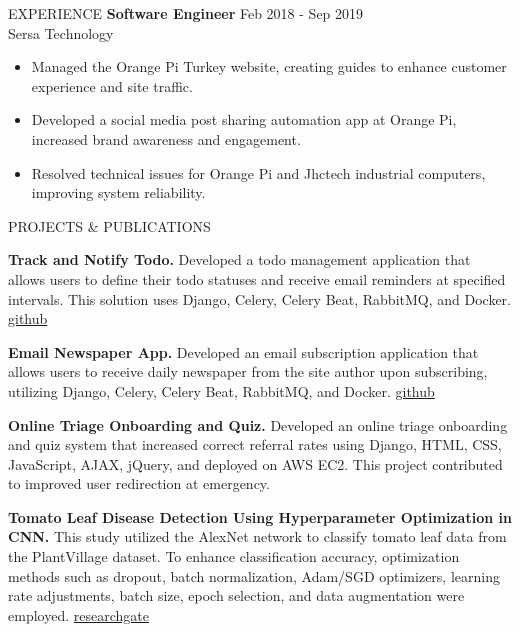 \documentclass{resume} %
\begin{document}
\begin{rSection}{EXPERIENCE}
\textbf{Software Engineer} \hfill Feb 2018 - Sep 2019\\
Sersa Technology
 \begin{itemize}
    \itemsep -3pt {}
     \item Managed the Orange Pi Turkey website, creating guides to enhance customer experience and site traffic.
     \item Developed a social media post sharing automation app at Orange Pi, increased brand awareness and engagement.
    \item Resolved technical issues for Orange Pi and Jhctech industrial computers, improving system reliability.
 \end{itemize}

\end{rSection}


\begin{rSection}{PROJECTS \& PUBLICATIONS}

\vspace{-1.25em}
\item \textbf{Track and Notify Todo.} {Developed a todo management application that allows users to define their todo statuses and receive email reminders at specified intervals. This solution uses Django, Celery, Celery Beat, RabbitMQ, and Docker.
\href{https://github.com/koksalkapucuoglu/track-and-notify_todo/}{ github}}
\item \textbf{Email Newspaper App.} {Developed an email subscription application that allows users to receive daily newspaper from the site author upon subscribing, utilizing Django, Celery, Celery Beat, RabbitMQ, and Docker.
\href{https://github.com/koksalkapucuoglu/python-subscribe-email-newspaper-app}{ github}}
\item \textbf{Online Triage Onboarding and Quiz.} {Developed an online triage onboarding and quiz system that increased correct referral rates using Django, HTML, CSS, JavaScript, AJAX, jQuery, and deployed on AWS EC2. This project contributed to improved user redirection at emergency.}\item \textbf{Tomato Leaf Disease Detection Using Hyperparameter Optimization in CNN.} {This study utilized the AlexNet network to classify tomato leaf data from the PlantVillage dataset. To enhance classification accuracy, optimization methods such as dropout, batch normalization, Adam/SGD optimizers, learning rate adjustments, batch size, epoch selection, and data augmentation were employed.
\href{https://www.researchgate.net/publication/358010251_Tomato_Leaf_Disease_Detection_Using_Hyperparameter_Optimization_in_CNN}{ researchgate}}

\end{rSection}
\end{document}
